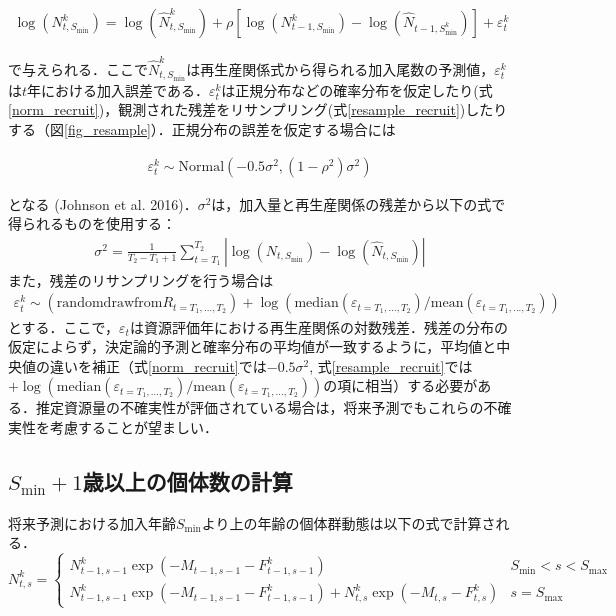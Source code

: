\documentclass[11pt]{jsarticle}
\begin{document}
\begin{eqnarray}
  \log (N_{t,S_{\mathrm{min}}}^k ) = \log (\hat{N}_{t,S_{\mathrm{min}}}^k)+\rho [ \log (N_{t-1,S_{\mathrm{min}}}^k) - \log(\hat{N}_{t-1,S_{\mathrm{min}}^k}) ] + \varepsilon_t^k
\end{eqnarray}

で与えられる．ここで$\hat{N}_{t,S_{\mathrm{min}}}^k$は再生産関係式から得られる加入尾数の予測値，$\varepsilon_t^k$は$t$年における加入誤差である．$\varepsilon_t^k$は正規分布などの確率分布を仮定したり(式\ref{norm_recruit})，観測された残差をリサンプリング(式\ref{resample_recruit})したりする（図\ref{fig_resample}）．正規分布の誤差を仮定する場合には

\begin{eqnarray}
  \varepsilon_t^k \sim \mathrm{Normal} (-0.5\sigma^2,(1-\rho^2 ) \sigma^2 )
  \label{norm_recruit}
\end{eqnarray}

となる (Johnson et al. 2016)．$\sigma^2$は，加入量と再生産関係の残差から以下の式で得られるものを使用する：
\begin{eqnarray}
  \sigma^2 = \frac{1}{T_2-T_{1}+1} \sum_{t=T_1}^{T_2} |\log (N_{t,S_{\mathrm{min}}}) -\log (\hat{N}_{t,S_{\mathrm{min}} } ) |  
\end{eqnarray}
また，残差のリサンプリングを行う場合は
\begin{eqnarray}
  \varepsilon_t^k \sim (\mathrm{random} \mathrm{draw} \mathrm{from}  R_{t={T_1,…,T_2}} ) + \log (\mathrm{median} (\varepsilon_{t={T_1,…,T_2}})/\mathrm{mean} (\varepsilon_{t={T_1,...,T_2}}))
        \label{resample_recruit}        
\end{eqnarray}
とする．ここで，$\varepsilon_t$は資源評価年における再生産関係の対数残差．残差の分布の仮定によらず，決定論的予測と確率分布の平均値が一致するように，平均値と中央値の違いを補正（式\ref{norm_recruit}では$-0.5\sigma^2$, 式\ref{resample_recruit}では $+\log (\mathrm{median} (\varepsilon_{t={T_1,…,T_2}})/\mathrm{mean} (\varepsilon_{t={T_1,...,T_2}}))$の項に相当）する必要がある．推定資源量の不確実性が評価されている場合は，将来予測でもこれらの不確実性を考慮することが望ましい\cite{ichinokawa}．

\subsection{$S_{\mathrm{min}}+1$歳以上の個体数の計算}
将来予測における加入年齢$S_{\mathrm{min}}$より上の年齢の個体群動態は以下の式で計算される．
\begin{equation}
  N_{t,s}^k = \begin{cases}
      N_{t-1, s-1}^k  \exp(-M_{t-1,s-1}-F_{t-1,s-1}^k )  &    S_\mathrm{min} < s < S_\mathrm{max} \\
      N_{t-1, s-1}^k  \exp(-M_{t-1,s-1}-F_{t-1,s-1}^k ) + N_{t, s}^k  \exp(-M_{t,s}-F_{t,s}^k) &   s=S_{\mathrm{max}}
  \end{cases}
  \label{future_eq}
\end{equation}
\end{document}
